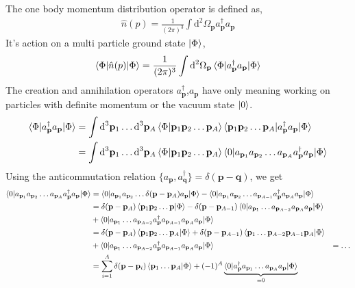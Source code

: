 \documentclass[10pt]{article}
\begin{document}
The one body momentum distribution operator is defined as,
\begin{align}
	\hat{n}(p) = \frac{1}{(2 \pi)^{3}} \int \textrm{d}^{2} \Omega_{\mathbf{p}} a_{\mathbf{p}}^{\dagger} a_{\mathbf{p}}
\end{align}
It's action on a multi particle ground state $\ket{\Phi}$,
\begin{align}
	\braket{ \Phi | \hat{n}(p) | \Phi} = \frac{1}{(2 \pi)^{3}} \int \textrm{d}^{2} \Omega_{\mathbf{p}} \braket{ \Phi | a_{\mathbf{p}}^{\dagger} a_{\mathbf{p}} | \Phi}
\end{align}
The creation and annihilation operators $a_{\mathbf{p}}^{\dagger}$,$a_{\mathbf{p}}$ have only meaning working on particles with definite momentum or the vacuum state $\ket{0}$.
\begin{align}
	\braket{ \Phi | a_{\mathbf{p}}^{\dagger} a_{\mathbf{p}} | \Phi} &= \int \textrm{d}^{3} \mathbf{p}_{1} \ldots \textrm{d}^{3} \mathbf{p}_{A} \braket {\Phi | \mathbf{p}_1 \mathbf{p}_2 \ldots \mathbf{p}_{A}} \braket{ \mathbf{p}_{1} \mathbf{p}_{2} \ldots \mathbf{p}_{A} | a_{\mathbf{p}}^{\dagger} a_{\mathbf{p}} | \Phi } \\
	&= \int \textrm{d}^{3} \mathbf{p}_{1} \ldots \textrm{d}^{3} \mathbf{p}_{A} \braket {\Phi | \mathbf{p}_1 \mathbf{p}_2 \ldots \mathbf{p}_{A}} \braket{ 0 | a_{\mathbf{p}_{1}} a_{\mathbf{p}_{2}} \ldots a_{\mathbf{p}_{A}} a_{\mathbf{p}}^{\dagger} a_{\mathbf{p}} | \Phi } 
\end{align}
Using the anticommutation relation $\{ a_{\mathbf{p}} ,a_{\mathbf{q}}^{\dagger} \} = \delta(\mathbf{p}-\mathbf{q})$, we get
\begin{align}
	\braket{0 | a_{\mathbf{p}_{1}} a_{\mathbf{p}_{2}} \ldots a_{\mathbf{p}_{A}} a_{\mathbf{p}}^{\dagger} a_{\mathbf{p}} | \Phi} &=
	\braket{0 | a_{\mathbf{p}_{1}} a_{\mathbf{p}_{2}} \ldots \delta(\mathbf{p}-\mathbf{p}_{A}) a_{\mathbf{p}} | \Phi} - \braket{0 | a_{\mathbf{p}_{1}} a_{\mathbf{p}_{2}} \ldots a_{\mathbf{p}_{A-1}} a_{\mathbf{p}}^{\dagger} a_{\mathbf{p}_{A}} a_{\mathbf{p}} | \Phi} \\
	&= \delta(\mathbf{p}-\mathbf{p}_{A}) \braket{\mathbf{p}_{1} \mathbf{p}_{2} \ldots \mathbf{p} | \Phi } - \delta(\mathbf{p}-\mathbf{p}_{A-1}) \braket{0 | a_{\mathbf{p}_1} \ldots a_{\mathbf{p}_{A-2}} a_{\mathbf{p}_{A}} a_{\mathbf{p}} | \Phi} \\
	&+ \braket{0| a_{\mathbf{p}_1} \ldots a_{\mathbf{p}_{A-2}} a_{\mathbf{p}}^{\dagger} a_{\mathbf{p}_{A-1}} a_{\mathbf{p}_{A}} a_{\mathbf{p}} | \Phi} \\
 &= \delta(\mathbf{p}-\mathbf{p}_{A}) \braket{\mathbf{p}_{1} \mathbf{p}_{2} \ldots \mathbf{p}_{A} | \Phi } + \delta(\mathbf{p}-\mathbf{p}_{A-1}) \braket{\mathbf{p}_{1} \ldots \mathbf{p}_{A-2} \mathbf{p}_{A-1} \mathbf{p}_{A} | \Phi} \\
	&+ \braket{0| a_{\mathbf{p}_1} \ldots a_{\mathbf{p}_{A-2}} a_{\mathbf{p}}^{\dagger} a_{\mathbf{p}_{A-1}} a_{\mathbf{p}_{A}} a_{\mathbf{p}} | \Phi}
	&= \ldots \\
	&= \sum_{i=1}^{A} \delta(\mathbf{p} - \mathbf{p}_{i}) \braket{ \mathbf{p}_{1} \ldots \mathbf{p}_{A} | \Phi} + (-1)^{A} \underbrace{\braket{ 0 | a_{\mathbf{p}}^{\dagger} a_{\mathbf{p}_1} \ldots a_{\mathbf{p}_{A}} a_{\mathbf{p}} | \Phi}}_{=0}
\end{align}
\end{document}
